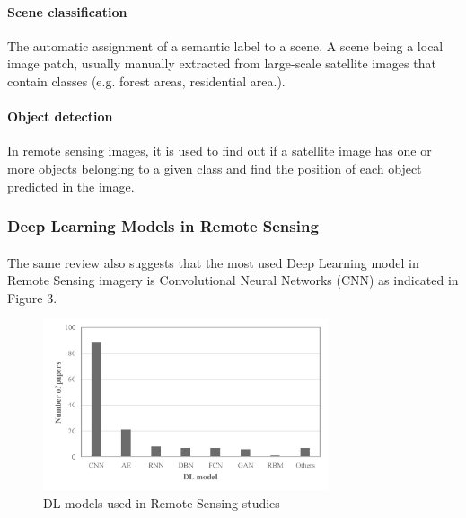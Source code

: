 \documentclass{article}
\begin{document}
\paragraph{Scene classification} The automatic assignment of a semantic label to a scene. A scene being a local image patch, usually manually extracted from large-scale satellite images that contain classes (e.g. forest areas, residential area.)\cite{https://doi.org/10.1002/widm.1264}.

\paragraph{Object detection} In remote sensing images, it is used to find out if a satellite image has one or more objects belonging to a given class and find the position of each object predicted in the image.\cite{CHENG201611}

\subsubsection{Deep Learning Models in Remote Sensing}
\paragraph{}
The same review \cite{MA2019166} also suggests that the most used Deep Learning model in Remote Sensing imagery is Convolutional Neural Networks (CNN) as indicated in Figure 3.
    \begin{figure}[hbt!]
        \centering
        \includegraphics[width=0.75\textwidth]{DL_MA.jpg}
        \caption{DL models used in Remote Sensing studies \cite{MA2019166}}
    \end{figure}
    
\end{document}
